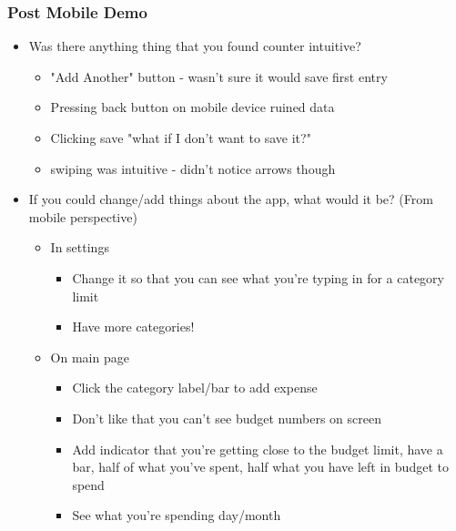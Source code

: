 \documentclass{chi2011}
\begin{document}
\begin{itemize}[noitemsep]
	\subsubsection{Post Mobile Demo}
	\begin{itemize}[noitemsep]
		\item Was there anything thing that you found counter intuitive?
		\begin{itemize}[noitemsep]
			\item "Add Another" button - wasn't sure it would save first entry
			\item Pressing back button on mobile device ruined data
			\item Clicking save "what if I don't want to save it?"
			\item swiping was intuitive - didn't notice arrows though
		\end{itemize}
		\item If you could change/add things about the app, what would it be? (From mobile perspective)
		\begin{itemize}[noitemsep]
			\item In settings 
			\begin{itemize}[noitemsep]
				\item Change it so that you can see what you're typing in for a category limit
				\item Have more categories!
			\end{itemize}
			\item On main page
			\begin{itemize}[noitemsep]
				\item Click the category label/bar to add expense
				\item Don't like that you can't see budget numbers on screen 
				\item Add indicator that you're getting close to the budget limit, have a bar, half of what
				  you've spent, half what you have left in budget to spend
				\item See what you're spending day/month
			\end{itemize}
		\end{itemize}
	\end{itemize}


\end{itemize}
\end{document}
